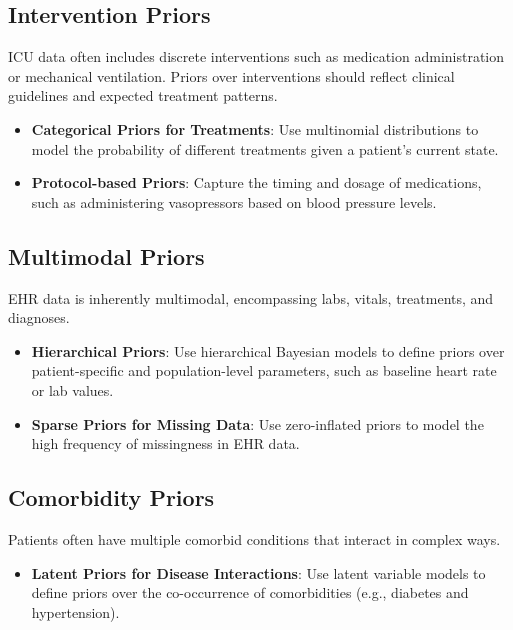 \documentclass{article}
\begin{document}
\subsection{Intervention Priors}

ICU data often includes discrete interventions such as medication administration or mechanical ventilation. Priors over interventions should reflect clinical guidelines and expected treatment patterns.

\begin{itemize}
    \item \textbf{Categorical Priors for Treatments}: Use multinomial distributions to model the probability of different treatments given a patient's current state.
    \item \textbf{Protocol-based Priors}: Capture the timing and dosage of medications, such as administering vasopressors based on blood pressure levels.
\end{itemize}

\subsection{Multimodal Priors}

EHR data is inherently multimodal, encompassing labs, vitals, treatments, and diagnoses.

\begin{itemize}
    \item \textbf{Hierarchical Priors}: Use hierarchical Bayesian models to define priors over patient-specific and population-level parameters, such as baseline heart rate or lab values.
    \item \textbf{Sparse Priors for Missing Data}: Use zero-inflated priors to model the high frequency of missingness in EHR data.
\end{itemize}

\subsection{Comorbidity Priors}

Patients often have multiple comorbid conditions that interact in complex ways.

\begin{itemize}
    \item \textbf{Latent Priors for Disease Interactions}: Use latent variable models to define priors over the co-occurrence of comorbidities (e.g., diabetes and hypertension).
\end{itemize}
\end{document}
